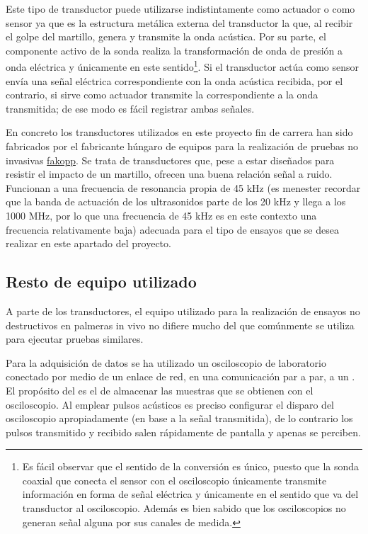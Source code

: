 Este tipo de transductor puede utilizarse indistintamente como actuador o
como sensor ya que es la estructura metálica externa del transductor la
que, al recibir el golpe del martillo, genera y transmite la onda acústica.
Por su parte, el componente activo de la sonda realiza la transformación de
onda de presión a onda eléctrica y únicamente en este sentido\footnote{Es
fácil observar que el sentido de la conversión es único, puesto que la
sonda coaxial que conecta el sensor con el osciloscopio únicamente
transmite información en forma de señal eléctrica y únicamente en el
sentido que va del transductor al osciloscopio. Además es bien sabido que
los osciloscopios no generan señal alguna por sus canales de medida.}. Si
el transductor actúa como sensor envía una señal eléctrica correspondiente
con la onda acústica recibida, por el contrario, si sirve como actuador
transmite la correspondiente a la onda transmitida; de ese modo es fácil
registrar ambas señales.

En concreto los transductores utilizados en este proyecto fin de carrera
han sido fabricados por el fabricante húngaro de equipos para la
realización de pruebas no invasivas
\href{http://www.fakopp.com/site/piezo}{fakopp}. Se trata de transductores que,
pese a estar diseñados para resistir el impacto de un martillo, ofrecen una
buena relación señal a ruido. Funcionan a una frecuencia de resonancia
propia de 45 kHz (es menester recordar que la banda de actuación de los
ultrasonidos parte de los 20 kHz y llega a los 1000 MHz, por lo que una
frecuencia de 45 kHz es en este contexto una frecuencia relativamente
baja) adecuada para el tipo de ensayos que se desea realizar en este
apartado del proyecto.


\subsection{Resto de equipo utilizado}

A parte de los transductores, el equipo utilizado para la realización de
ensayos no destructivos en palmeras in vivo no difiere mucho del que
comúnmente se utiliza para ejecutar pruebas similares.

Para la adquisición de datos se ha utilizado un osciloscopio de laboratorio
conectado por medio de un enlace de red, en una comunicación par a par, a
un . El propósito del  es el de almacenar las muestras que
se obtienen con el osciloscopio. Al emplear pulsos acústicos es preciso
configurar el disparo del osciloscopio apropiadamente (en base a la señal
transmitida), de lo contrario los pulsos transmitido y recibido salen
rápidamente de pantalla y apenas se perciben.

